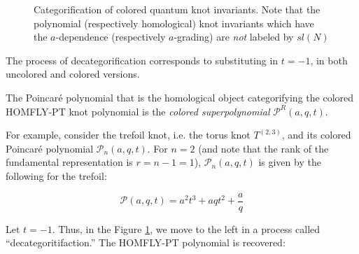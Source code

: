 \documentclass[a4paper,titlepage,twoside]{book}
\begin{document}
\begin{figure}[h]
\begin{center}
\end{center}
\caption{Categorification of colored quantum knot invariants. Note that the polynomial (respectively homological) knot invariants which have the $a$-dependence (respectively $a$-grading) are \emph{not} labeled by $sl{(N)}$ } \label{Fig:CatcoloredsuperPoly01}
\end{figure}



The process of decategorification corresponds to substituting in $t=-1$, in both uncolored and colored versions.  

The Poincar\'{e} polynomial that is the homological object categorifying the colored HOMFLY-PT knot polynomial is the \emph{colored superpolynomial} $\mathcal{P}^R{ (a,q,t)}$.  

For example, consider the trefoil knot, i.e. the torus knot $T^{(2,3)}$, and its colored Poincar\'{e} polynomial $\mathcal{P}_n{ (a,q,t)}$.  For $n=2$ (and note that the rank of the fundamental representation is $r=n-1=1$),  $\mathcal{P}_n{ (a,q,t)}$ is given by the following for the trefoil:

\begin{equation}
\mathcal{P}{ (a,q,t )} =   a^{2} t^{3} + a q t^{2} + \frac{a}{q} \label{Eq:coloredPtrefoilr01}
\end{equation}

Let $t=-1$.  Thus, in the Figure \ref{Fig:CatcoloredsuperPoly01}, we move to the left in a process called ``decategoritifaction.''  The HOMFLY-PT polynomial is recovered:
\end{document}
